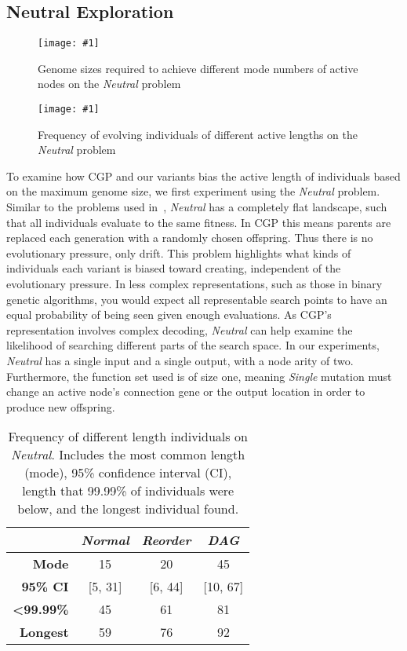 \documentclass{sig-alternate}
\newcommand{\includegraphicsfit}[1]
{\texttt{[image: \#1]}}
\begin{document}
\subsection{Neutral Exploration}
\label{sec-neutral}

\begin{figure}
  \centering
  \includegraphicsfit{neutral}
  \caption{Genome sizes required to achieve different mode
           numbers of active nodes on the \emph{Neutral} problem} 
  \label{fig-neutral}
\end{figure}


\begin{figure}
  \centering
  \includegraphicsfit{length_frequencies_100}
  \caption{Frequency of evolving individuals of different active lengths
           on the \emph{Neutral} problem} 
  \label{fig-length}
\end{figure}

To examine how CGP and our variants bias the active length of individuals
based on the maximum genome size, we first experiment using the \emph{Neutral} problem.
Similar to the problems used in~\cite{miller:2001:bloat,collins:2006:haystacks},
\emph{Neutral} has a completely flat landscape, such that all individuals
evaluate to the same fitness.  In CGP this means parents are replaced each
generation with a randomly chosen offspring. Thus there is no evolutionary pressure, only drift.
This problem highlights what kinds of individuals each variant is biased toward
creating, independent of the evolutionary pressure.
In less complex representations, such as those in binary genetic
algorithms, you would expect all representable
search points to have an equal probability of being seen given enough evaluations.  As CGP's representation
involves complex decoding, \emph{Neutral} can help examine the likelihood of searching
different parts of the search space.  
In our experiments, \emph{Neutral} has a single input and a single output,
with a node arity of two.  Furthermore, the function set used is of size one, meaning
\emph{Single} mutation must change an active node's connection gene or the output location
in order to produce new offspring.

\begin{table}
	\centering
	\begin{tabular}{|r|c|c|c|}
	  \hline
& \textbf{\emph{Normal}} & \textbf{\emph{Reorder}} & \textbf{\emph{DAG}} \\ \hline
    \textbf{Mode} & 15      & 20      & 45 \\ \hline
 \textbf{95\% CI} & [5, 31] & [6, 44] & [10, 67] \\ \hline
\textbf{<99.99\%} & 45      & 61      & 81 \\ \hline
 \textbf{Longest} & 59      & 76      & 92 \\ \hline
	\end{tabular}
	\caption{Frequency of different length individuals on \emph{Neutral}. 
	         Includes the most common length (mode), 95\% confidence interval (CI),
	         length that 99.99\% of individuals were below, and the longest individual found.}
	\label{table-length}
\end{table}
\end{document}
